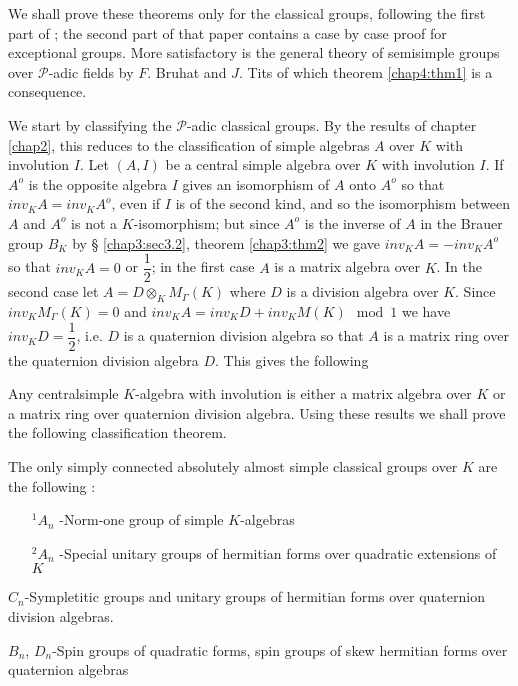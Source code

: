 We shall prove these theorems only for the classical groups, following
the first part of \cite{keyK2}; the second part of that paper contains a
case by case proof for exceptional groups. More satisfactory is the
general theory of semisimple groups over $\mathscr{P}$-adic fields by
$F$. Bruhat and $J$. Tits \cite{keyB-T} of which theorem \ref{chap4:thm1} is a
consequence. 

We start by classifying the $\mathscr{P}$-adic classical groups. By
the results of chapter \ref{chap2}, this reduces to the classification of
simple algebras $A$ over $K$ with involution $I$. Let $(A,I)$ be a
central simple algebra over $K$ with involution $I$. If $A^o$ is the
opposite algebra $I$ gives an isomorphism of $A$ onto $A^o$ so that
$inv_K A = inv_K A^o $, even if $I$ is of the second kind, and so the
isomorphism between $A$ and $A^o$ is not a $K$-isomorphism; but since
$A^o$ is the inverse of $A$ in the Brauer group $B_K$ by \S
\ref{chap3:sec3.2}, 
theorem \ref{chap3:thm2} we gave $inv_K A = -inv_K A^o $ so that
$inv_K A =0 $ or 
$\dfrac{1}{2}$; in the first case $A$ is a matrix algebra over $K$. In
the second case let $A = D \otimes_K M_\Gamma (K)$ where $D$ is a division
algebra over $K$. Since $inv_K M_\Gamma(K) = 0 $ and $inv_K A = inv_K D +
inv_K M(K)  \mod 1$ we have $inv_K D = \dfrac{1}{2}$, i.e. $D$ is a
quaternion division algebra so that $A$ is a matrix ring over the
quaternion division algebra $D$. This gives the following 

\setcounter{proposition}{0}
\begin{proposition}\label{chap4:prop1}%
Any central\pageoriginale simple $K$-algebra with involution is either
a matrix algebra over $K$ or a matrix ring over quaternion division 
algebra. Using these results we shall prove the following
classification theorem. 
\end{proposition}

\begin{theorem*}
The only simply connected absolutely almost simple classical groups
over $K$ are the following : 
\begin{itemize}
\item[${}^1 A_n$]-Norm-one group of simple $K$-algebras 

\item[${}^2 A_n$]-Special unitary groups of hermitian forms over
  quadratic extensions of $K$ 
\end{itemize}

$C_n$-Sympletitic groups and unitary groups of hermitian forms over
quaternion division algebras. 

$B_n$, $D_n$-Spin groups of quadratic forms, spin groups of skew
hermitian forms over quaternion algebras  
\end{theorem*}

